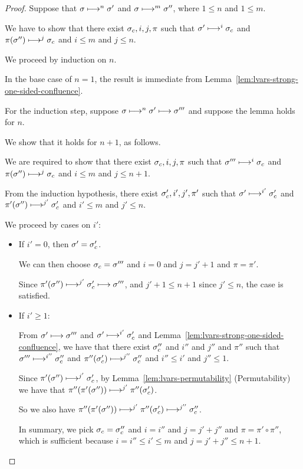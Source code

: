 \begin{proof}
  Suppose that $\sigma \longmapsto^n \sigma'$ and $\sigma \longmapsto^m
  \sigma''$, where $1 \leq n$ and $1 \leq m$.

  We have to show that there exist $\sigma_c, i, j, \pi$ such that
  $\sigma' \longmapsto^i \sigma_c$ and $\pi(\sigma'') \longmapsto^j
  \sigma_c$ and $i \leq m$ and $j \leq n$.

  We proceed by induction on $n$.

  In the base case of $n = 1$, the result is immediate from
  Lemma~\ref{lem:lvars-strong-one-sided-confluence}.

  For the induction step, suppose $\sigma \longmapsto^n \sigma'
  \longmapsto \sigma'''$ and suppose the lemma holds for $n$.

  We show that it holds for $n + 1$, as follows.

  We are required to show that there exist $\sigma_c, i, j, \pi$ such
  that $\sigma''' \longmapsto^i \sigma_c$ and $\pi(\sigma'')
  \longmapsto^j \sigma_c$ and $i \leq m$ and $j \leq n + 1$.

  From the induction hypothesis, there exist $\sigma'_c, i', j', \pi'$
  such that $\sigma' \longmapsto^{i'} \sigma'_c$ and $\pi'(\sigma'')
  \longmapsto^{j'} \sigma'_c$ and $i' \leq m$ and $j' \leq n$.

  We proceed by cases on $i'$:
  \begin{itemize}

  \item If $i' = 0$, then $\sigma' = \sigma_c'$.

    We can then choose $\sigma_c = \sigma'''$ and $i = 0$ and $j = j' +
    1$ and $\pi = \pi'$.

    Since $\pi'(\sigma'') \longmapsto^{j'} \sigma'_c \longmapsto
    \sigma'''$, and $j' + 1 \leq n + 1$ since $j' \leq n$, the case is
    satisfied.

  \item If $i' \geq 1$:

    From $\sigma' \longmapsto \sigma'''$ and $\sigma' \longmapsto^{i'}
    \sigma_c'$ and Lemma~\ref{lem:lvars-strong-one-sided-confluence},
    we have that there exist $\sigma_c''$ and $i''$ and $j''$ and
    $\pi''$ such that $\sigma''' \longmapsto^{i''} \sigma_c''$ and
    $\pi''(\sigma_c') \longmapsto^{j''} \sigma_c''$ and $i'' \leq i'$
    and $j'' \leq 1$.

    Since $\pi'(\sigma'') \longmapsto^{j'} \sigma'_c$, by
    Lemma~\ref{lem:lvars-permutability} (Permutability) we have that
    $\pi''(\pi'(\sigma'')) \longmapsto^{j'} \pi''(\sigma'_c)$.

    So we also have $\pi''(\pi'(\sigma'')) \longmapsto^{j'}
    \pi''(\sigma'_c) \longmapsto^{j''} \sigma_c''$.

    In summary, we pick $\sigma_c = \sigma_c''$ and $i = i''$ and $j =
    j' + j''$ and $\pi = \pi' \circ \pi''$, which is sufficient
    because $i = i'' \leq i' \leq m$ and $j = j' + j'' \leq n + 1$.
  \end{itemize}

\end{proof}
